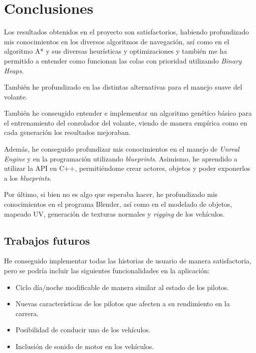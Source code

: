 \chapter{Conclusiones}
Los resultados obtenidos en el proyecto son satisfactorios, habiendo profundizado mis conocimientos en los diversos algoritmos de navegación, así como en el algoritmo A* y sus diversas heurísticas y optimizaciones y también me ha permitido a entender como funcionan las colas con prioridad utilizando \textit{Binary Heaps}.

\bigskip

También he profundizado en las distintas alternativas para el manejo suave del volante.

\bigskip 
También he conseugido entender e implementar un algoritmo genético básico para el entrenamiento del conrolador del volante, viendo de manera empírica como en cada generación los resultados mejoraban.

\bigskip

Además, he conseguido profundizar mis conocimientos en el manejo de \textit{Unreal Engine} y en la programación utilizando \textit{blueprints}. Asimismo, he aprendido a utilizar la API en C++, permitiéndome crear actores, objetos y poder exponerlos a los \textit{blueprints}.


\bigskip
Por último, si bien no es algo que esperaba hacer, he profundizado mis conocimientos en el programa Blender, así como en el modelado de objetos, mapeado UV, generación de texturas normales y \textit{rigging} de los vehículos.


\section{Trabajos futuros}

He conseguido implementar todas las historias de usuario de manera satisfactoria, pero se podría incluir las siguientes funcionalidades en la aplicación:

\begin{itemize}
    \item Ciclo día/noche modificable de manera similar al estado de los pilotos.
    \item Nuevas características de los pilotos que afecten a su rendimiento en la carrera.
    \item Posibilidad de conducir uno de los vehículos.
    \item Inclusión de sonido de motor en los vehículos.
\end{itemize}

